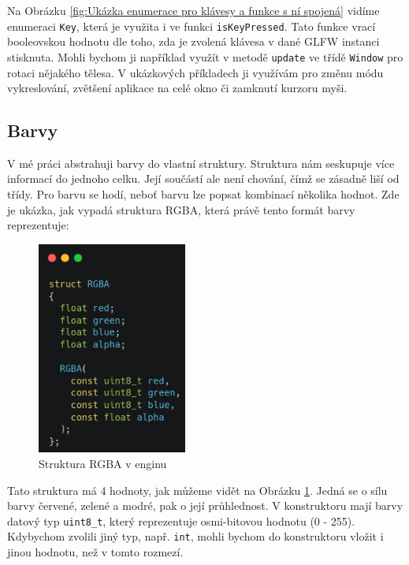 \documentclass[12pt]{article}
\begin{document}
Na Obrázku \ref{fig:Ukázka enumerace pro klávesy a funkce s ní spojená} vidíme enumeraci \texttt{Key}, která je využita i ve funkci \texttt{isKeyPressed}. Tato funkce vrací booleovskou hodnotu dle toho, zda je zvolená klávesa v dané GLFW instanci stisknuta. Mohli bychom ji například využít v metodě \texttt{update} ve třídě \texttt{Window} pro rotaci nějakého tělesa. V ukázkových příkladech ji využívám pro změnu módu vykreslování, zvětšení aplikace na celé okno či zamknutí kurzoru myši.

\pagebreak

\subsection{Barvy}

V mé práci abstrahuji barvy do vlastní struktury. Struktura nám seskupuje více informací do jednoho celku. Její součástí ale není chování, čímž se zásadně liší od třídy. \cite{struct} Pro barvu se hodí, neboť barvu lze popsat kombinací několika hodnot. Zde je ukázka, jak vypadá struktura RGBA, která právě tento formát barvy reprezentuje:

\vspace{0.5cm}
\begin{figure}[h]
    \centering
    \includegraphics[height=7cm]{images/rgba.png}
    \caption{Struktura RGBA v enginu}
    \label{fig:Struktura RGBA v enginu}
\end{figure}

Tato struktura má 4 hodnoty, jak můžeme vidět na Obrázku \ref{fig:Struktura RGBA v enginu}. Jedná se o sílu barvy červené, zelené a modré, pak o její průhlednost. V konstruktoru mají barvy datový typ \texttt{uint8_t}, který reprezentuje osmi-bitovou hodnotu (0 - 255). Kdybychom zvolili jiný typ, např. \texttt{int}, mohli bychom do konstruktoru vložit i jinou hodnotu, než v tomto rozmezí.
\end{document}
